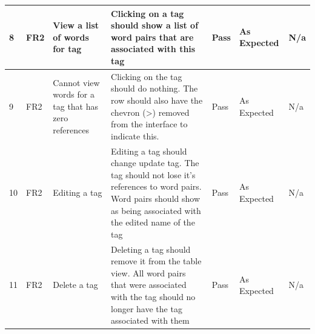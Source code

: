 \documentclass[paper=a4, fontsize=11pt]{scrartcl}	%
\numberwithin{equation}{section}															%
\numberwithin{figure}{section}																%
\numberwithin{table}{section}
\begin{document}
\begin{landscape}
\begin{longtable}{|l|p{2cm}|p{5cm}|p{5cm}|l|p{5cm}|p{5cm}|}
8  & FR2                    & View a list of words for tag                         & Clicking on a tag should show a list of word pairs that are associated with this tag                                                                                                                                                       & Pass      & As Expected                                        & N/a                                                                                                                                                                                                                        \\ \hline
9  & FR2                    & Cannot view words for a tag that has zero references & Clicking on the tag should do nothing. The row should also have the chevron (\textgreater) removed from the interface to indicate this.                                                                                                    & Pass      & As Expected                                        & N/a                                                                                                                                                                                                                        \\ \hline
10 & FR2                    & Editing a tag                                        & Editing a tag should change update tag. The tag should not lose it’s references to word pairs. Word pairs should show as being associated with the edited name of the tag                                                                  & Pass      & As Expected                                        & N/a                                                                                                                                                                                                                        \\ \hline
11 & FR2                    & Delete a tag                                         & Deleting a tag should remove it from the table view. All word pairs that were associated with the tag should no longer have the tag associated with them                                                                                   & Pass      & As Expected                                        & N/a                                                                                                                                                                                                                        \\ \hline

\end{longtable}
\end{landscape}
\end{document}

